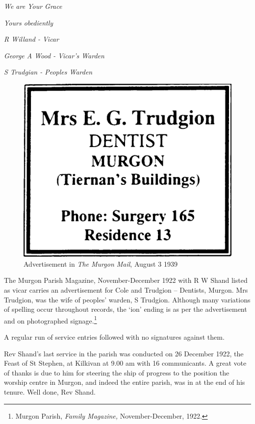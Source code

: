 \emph{We are Your Grace}



\emph{Yours obediently}



\emph{R Willand - Vicar}



\emph{George A Wood - Vicar's Warden}



\emph{S Trudgian - Peoples Warden}



\medskip








\begin{figure}
\begin{center}
\includegraphics[width=.5\linewidth,center]{../images/trudgionAd.jpg}
\caption{Advertisement in \emph{The Murgon Mail}, August 3 1939}
\end{center}
\end{figure}




The Murgon Parish Magazine, November-December 1922 with R W Shand listed as vicar carries an advertisement for Cole and Trudgion -- Dentists, Murgon. Mrs Trudgion, was the wife of peoples' warden, S Trudgion. Although many variations of spelling occur throughout records, the `ion' ending is as per the advertisement and on photographed signage.\footnote{Murgon Parish, \emph{Family Magazine,} November-December, 1922.}


A regular run of service entries followed with no signatures against them.



Rev Shand's last service in the parish was conducted on 26 December 1922, the Feast of St Stephen, at Kilkivan at 9.00 am with 16 communicants. A great vote of thanks is due to him for steering the ship of progress to the position the worship centre in Murgon, and indeed the entire parish, was in at the end of his tenure. Well done, Rev Shand.



